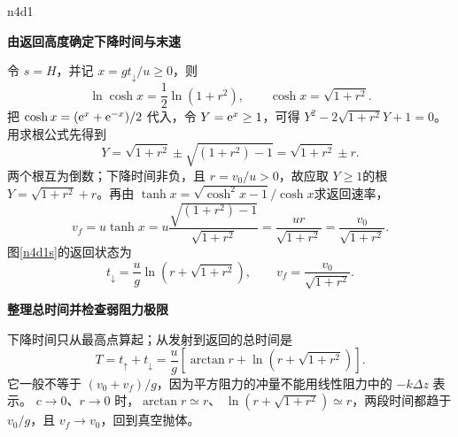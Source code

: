 \begin{drillsolution}{n4d1}
\par\medskip{}\noindent\textbf{由返回高度确定下降时间与末速}\par\nobreak
令 $s=H$，并记 $x=gt_\downarrow/u\ge0$，则
\[
 \ln\cosh x=\frac12\ln(1+r^2),\qquad
 \cosh x=\sqrt{1+r^2}.
\]
把 $\cosh x=(\mathrm e^x+\mathrm e^{-x})/2$ 代入，令 $Y=\mathrm e^x\ge1$，可得
$Y^2-2\sqrt{1+r^2}Y+1=0$。
用求根公式先得到
\[
 Y=\sqrt{1+r^2}\pm\sqrt{(1+r^2)-1}
 =\sqrt{1+r^2}\pm r.
\]
两个根互为倒数；下降时间非负，且 $r=v_0/u>0$，故应取 $Y\ge1$的根 $Y=\sqrt{1+r^2}+r$。再由 $\tanh x=\sqrt{\cosh^2x-1}/\cosh x$求返回速率，
\[
 v_f=u\tanh x
 =u\frac{\sqrt{(1+r^2)-1}}{\sqrt{1+r^2}}
 =\frac{ur}{\sqrt{1+r^2}}=\frac{v_0}{\sqrt{1+r^2}}.
\]
图\ref{n4d1s}的返回状态为
\[
 t_\downarrow=\frac ug\ln\left(r+\sqrt{1+r^2}\right),\qquad
 v_f=\frac{v_0}{\sqrt{1+r^2}}.
\]


\par\medskip{}\noindent\textbf{整理总时间并检查弱阻力极限}\par\nobreak
下降时间只从最高点算起；从发射到返回的总时间是
\[
 T=t_\uparrow+t_\downarrow
 =\frac ug\left[\arctan r+\ln\left(r+\sqrt{1+r^2}\right)\right].
\]
它一般不等于 $(v_0+v_f)/g$，因为平方阻力的冲量不能用线性阻力中的 $-k\Delta z$ 表示。
$c\to0$、$r\to0$ 时，$\arctan r\simeq r$、
$\ln(r+\sqrt{1+r^2})\simeq r$，两段时间都趋于 $v_0/g$，且 $v_f\to v_0$，回到真空抛体。
\end{drillsolution}


